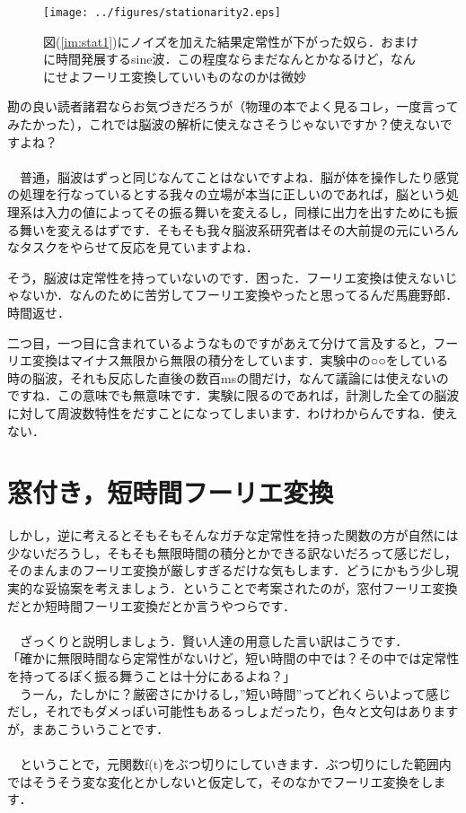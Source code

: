 \documentclass[11pt,a4paper]{ujreport} 	%
\begin{document}
\begin{figure}[H]
  \centering
  \texttt{[image: ../figures/stationarity2.eps]}
  \caption{図(\ref{im:stat1})にノイズを加えた結果定常性が下がった奴ら．おまけに時間発展するsine波．この程度ならまだなんとかなるけど，なんにせよフーリエ変換していいものなのかは微妙}
\end{figure}

勘の良い読者諸君ならお気づきだろうが（物理の本でよく見るコレ，一度言ってみたかった），これでは脳波の解析に使えなさそうじゃないですか？使えないですよね？\\
\\
　普通，脳波はずっと同じなんてことはないですよね．脳が体を操作したり感覚の処理を行なっているとする我々の立場が本当に正しいのであれば，脳という処理系は入力の値によってその振る舞いを変えるし，同様に出力を出すためにも振る舞いを変えるはずです．そもそも我々脳波系研究者はその大前提の元にいろんなタスクをやらせて反応を見ていますよね．

そう，脳波は定常性を持っていないのです．困った．フーリエ変換は使えないじゃないか．なんのために苦労してフーリエ変換やったと思ってるんだ馬鹿野郎．時間返せ．

二つ目，一つ目に含まれているようなものですがあえて分けて言及すると，フーリエ変換はマイナス無限から無限の積分をしています．実験中の○○をしている時の脳波，それも反応した直後の数百msの間だけ，なんて議論には使えないのですね．この意味でも無意味です．実験に限るのであれば，計測した全ての脳波に対して周波数特性をだすことになってしまいます．わけわからんですね．使えない．

\section{窓付き，短時間フーリエ変換}
しかし，逆に考えるとそもそもそんなガチな定常性を持った関数の方が自然には少ないだろうし，そもそも無限時間の積分とかできる訳ないだろって感じだし，そのまんまのフーリエ変換が厳しすぎるだけな気もします．どうにかもう少し現実的な妥協案を考えましょう．ということで考案されたのが，窓付フーリエ変換だとか短時間フーリエ変換だとか言うやつらです．\\
\\
　ざっくりと説明しましょう．賢い人達の用意した言い訳はこうです．\\
「確かに無限時間なら定常性がないけど，短い時間の中では？その中では定常性を持ってるぽく振る舞うことは十分にあるよね？」\\
　うーん，たしかに？厳密さにかけるし，”短い時間”ってどれくらいよって感じだし，それでもダメっぽい可能性もあるっしょだったり，色々と文句はありますが，まあこういうことです．\\
\\
　ということで，元関数f(t)をぶつ切りにしていきます．ぶつ切りにした範囲内ではそうそう変な変化とかしないと仮定して，そのなかでフーリエ変換をします．\\
\end{document}
